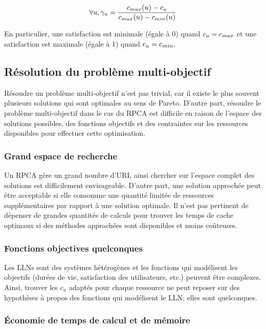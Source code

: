 \begin{equation}
  \forall u, \gamma_u = \dfrac{c_{max}(u) - c_u}{c_{max}(u) - c_{min}(u)}
  \label{cache:eq:user_satisfaction}
\end{equation}

En particulier, une satisfaction est minimale (égale à 0) quand $c_u = c_{max}$ et une satisfaction est maximale (égale à 1) quand $c_u = c_{min}$.

\subsection{Résolution du problème multi-objectif}

Résoudre un problème multi-objectif n'est pas trivial, car il existe le plus souvent plusieurs solutions qui sont optimales au sens de Pareto.
D'autre part, résoudre le problème multi-objectif dans le cas du \ac{RPCA} est difficile en raison de l'espace des solutions possibles, des fonctions objectifs et des contraintes sur les ressources disponibles pour effectuer cette optimisation.

\subsubsection{Grand espace de recherche}

Un \ac{RPCA} gère un grand nombre d'\ac{URI}, ainsi chercher sur l'espace complet des solutions est difficilement envisageable.
D'autre part, une solution approchée peut être acceptable si elle consomme une quantité limitée de ressources supplémentaires par rapport à une solution optimale.
Il n'est pas pertinent de dépenser de grandes quantités de calculs pour trouver les temps de cache optimaux si des méthodes approchées sont disponibles et moins coûteuses.

\subsubsection{Fonctions objectives quelconques}

Les \ac{LLN}s sont des systèmes hétérogènes et les fonctions qui modélisent les objectifs (durées de vie, satisfaction des utilisateurs, etc.) peuvent être complexes.
Ainsi, trouver les $c_u$ adaptés pour chaque ressource ne peut reposer sur des hypothèses à propos des fonctions qui modélisent le \ac{LLN}; elles sont quelconques.

\subsubsection{Économie de temps de calcul et de mémoire}


